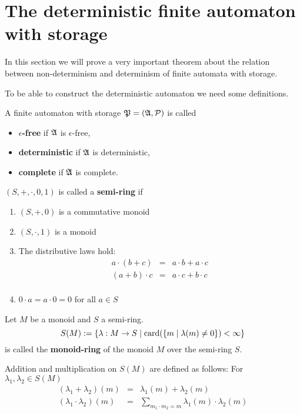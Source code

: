 \section{The deterministic finite automaton with storage}

In this section we will prove a very important theorem about the relation
between non-determinism and determinism of finite automata with storage.

To be able to construct the deterministic automaton we need some definitions.

\begin{definition}
A finite automaton with storage $\mbox{$\mathfrak{P}$}=(\mbox{$\mathfrak{A}$},\mbox{$\mathcal{P}$})$ is called
\begin{itemize}
  \item {\bf $\epsilon$-free} if $\mbox{$\mathfrak{A}$}$ is $\epsilon$-free,
  \item {\bf deterministic} if $\mbox{$\mathfrak{A}$}$ is deterministic,
  \item {\bf complete} if $\mbox{$\mathfrak{A}$}$ is complete.
\end{itemize}
\end{definition}

\bigskip
\begin{definition}
$(S, +, \cdot, 0, 1)$ is called a {\bf semi-ring} if
\begin{enumerate}
  \item $(S, +, 0)$ is a commutative monoid
  \item $(S, \cdot, 1)$ is a monoid
  \item The distributive laws hold:
  \begin{eqnarray*}
  a \cdot (b + c) &=& a \cdot b + a \cdot c\\
  (a + b) \cdot c &=& a \cdot c + b \cdot c\\
  \end{eqnarray*}
  \item $0 \cdot a = a \cdot 0 = 0$ for all $a \in S$
\end{enumerate}
\end{definition}

\bigskip
\begin{definition}
Let $M$ be a monoid and $S$ a semi-ring.
\[ S(M) := \mbox{$\{\lambda: M \to S \mid \mathrm{card}({\mbox{$\{m \mid \lambda(m) \neq 0\}$}})
< \infty\}$} \]
is called the {\bf monoid-ring} of the monoid $M$ over the semi-ring $S$.
\end{definition}

Addition and multiplication on $S(M)$ are defined as follows: For $\lambda_1,
\lambda_2 \in S(M)$
\begin{eqnarray*}
(\lambda_1 + \lambda_2)(m) &=& \lambda_1(m) + \lambda_2(m) \\
(\lambda_1 \cdot \lambda_2)(m) &=& \sum_{m_1 \cdot m_2 = m} 
\lambda_1(m) \cdot \lambda_2(m)
\end{eqnarray*}

